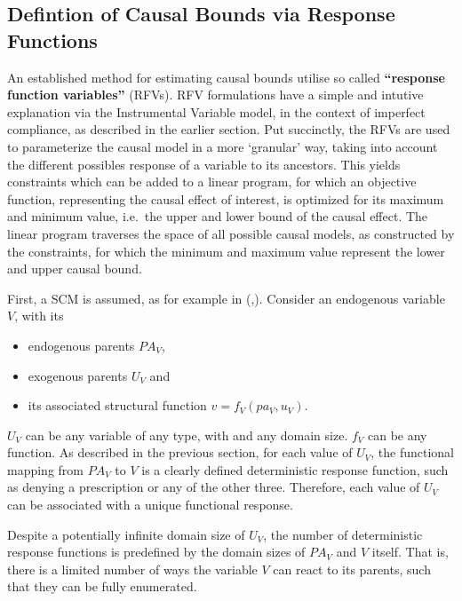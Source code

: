 \documentclass{article}
\begin{document}
    \hypertarget{defintion-of-causal-bounds-via-response-functions}{%
\subsection{Defintion of Causal Bounds via Response
Functions}\label{defintion-of-causal-bounds-via-response-functions}}

    An established method for estimating causal bounds utilise so called
\textbf{``response function variables''} (RFVs). RFV
formulations have a simple and intutive explanation via the Instrumental
Variable model, in the context of imperfect compliance, as described in
the earlier section. Put succinctly, the RFVs are used to parameterize
the causal model in a more `granular' way, taking into account
the different possibles response of a variable to its ancestors. This
yields constraints which can be added to a linear program, for which an objective function, representing the
causal effect of interest, is optimized for its maximum and minimum
value, i.e.~the upper and lower bound of the causal effect. The linear
program traverses the space of all possible causal models, as constructed by the constraints, for
which the minimum and maximum value represent the lower and upper causal
bound.

First, a SCM is assumed, as
for example in (\cite{wu2019pc},\cite{pearl2009causality}).
Consider an endogenous variable \(V\), with its 

\begin{itemize}
\item endogenous parents \(PA_V\),
\item exogenous parents \(U_V\) and 
\item its associated structural function $v = f_V(pa_V, u_V) $.
\end{itemize}

\(U_V\) can be any variable of any type, with and any domain size.
\(f_V\) can be any function. As described in the previous section, for each value of \(U_V\), the
functional mapping from \(PA_V\) to \(V\) is a clearly defined deterministic
response function, such as denying a prescription or any of the other
three. Therefore, each value of \(U_V\) can be associated with a unique
functional response.

Despite a potentially infinite domain size of \(U_V\), the
number of deterministic response functions is predefined by the domain
sizes of \(PA_V\) and \(V\) itself. That is, there is a limited number
of ways the variable \(V\) can react to its parents, such that they can
be fully enumerated.
\end{document}
